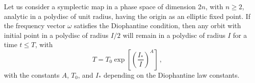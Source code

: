 \begin{theorem}
    Let us consider a symplectic map in a phase space of dimension 2$n$, with $n\geq 2$, analytic in a polydisc of unit radius, having the origin as an elliptic fixed point. If the frequency vector $\omega$ satisfies the Diophantine condition, then any orbit with initial point in a polydisc of radius $I/2$ will remain in a polydisc of radius $I$ for a time $t\leq T$, with
    \begin{equation}
        T = T_0 \exp\left[\left(\frac{I_\ast}{I}\right)^A\right]\,,
    \end{equation}
    with the constants $A$, $T_0$, and $I_\ast$ depending on the Diophantine law constants.
\end{theorem}